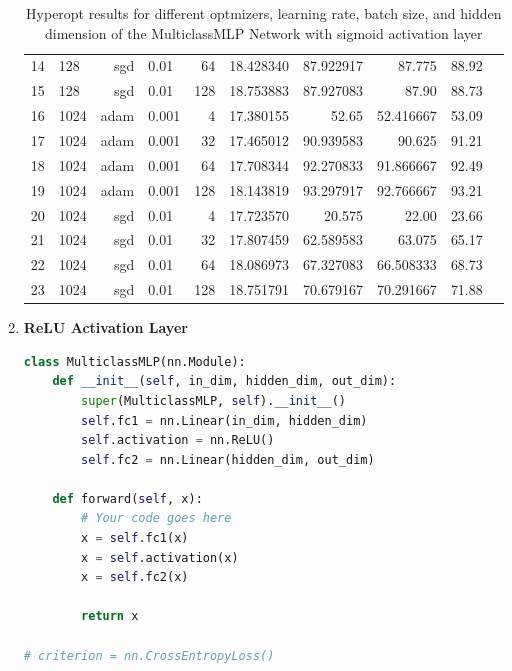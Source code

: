 \begin{solve}
\begin{enumerate}
\begin{table}[H]
\begin{tabular}{rlrlrrrrrr}
            14 & 128 & sgd & 0.01 & 64 & 18.428340 & 87.922917 & 87.775& 88.92 \\
            15 & 128 & sgd & 0.01 & 128 & 18.753883 & 87.927083 & 87.90 & 88.73 \\
            \rowcolor{red!50}
            16 & 1024 & adam & 0.001& 4 & 17.380155 & 52.65 & 52.416667 & 53.09 \\
            17 & 1024 & adam & 0.001& 32 & 17.465012 & 90.939583 & 90.625& 91.21 \\
            18 & 1024 & adam & 0.001& 64 & 17.708344 & 92.270833 & 91.866667 & 92.49 \\
            19 & 1024 & adam & 0.001& 128 & 18.143819 & 93.297917 & 92.766667 & 93.21 \\
            \rowcolor{red!50}
            20 & 1024 & sgd & 0.01 & 4 & 17.723570 & 20.575& 22.00 & 23.66 \\
            21 & 1024 & sgd & 0.01 & 32 & 17.807459 & 62.589583 & 63.075& 65.17 \\
            22 & 1024 & sgd & 0.01 & 64 & 18.086973 & 67.327083 & 66.508333 & 68.73 \\
            23 & 1024 & sgd & 0.01 & 128 & 18.751791 & 70.679167 & 70.291667 & 71.88 \\
            \bottomrule
            \end{tabular}
            \caption{Hyperopt results for different optmizers, learning rate, batch size, and hidden dimension of the MulticlassMLP Network with sigmoid activation layer}
            \label{TableHyperoptSigmoid}
        \end{table}
        \item \textbf{ReLU Activation Layer}

        \begin{lstlisting}[language=python]
class MulticlassMLP(nn.Module):
    def __init__(self, in_dim, hidden_dim, out_dim):
        super(MulticlassMLP, self).__init__()
        self.fc1 = nn.Linear(in_dim, hidden_dim)
        self.activation = nn.ReLU()
        self.fc2 = nn.Linear(hidden_dim, out_dim)
        
    def forward(self, x):
        # Your code goes here
        x = self.fc1(x)
        x = self.activation(x)
        x = self.fc2(x)
        
        return x

# criterion = nn.CrossEntropyLoss()
    \end{lstlisting}



\end{enumerate}
\end{solve}
